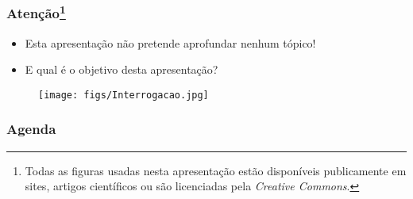 
\begin{frame}
    \frametitle{Atenção\footnote{Todas as figuras usadas nesta apresentação estão disponíveis publicamente em sites, artigos científicos ou são licenciadas pela \textit{Creative Commons}.}}
    \begin{itemize}
        \item Esta apresentação não pretende aprofundar nenhum tópico!
        \item E qual é o objetivo desta apresentação?
    \end{itemize}
    \begin{figure}
        \centering
        \texttt{[image: figs/Interrogacao.jpg]}
    \end{figure}
    \vspace{1.7cm}
\end{frame}

\begin{frame}
    \frametitle{Agenda}
    \tableofcontents
\end{frame}